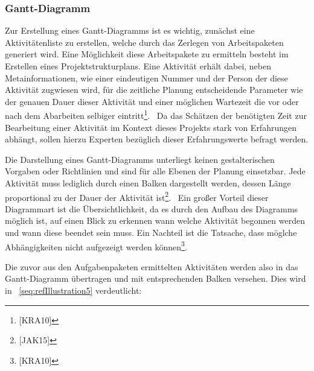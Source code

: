 \documentclass[a4paper]{article}
\begin{document}
\subsubsection[Gantt{}-Diagramm]{\color{black} Gantt-Diagramm}
{\sffamily
Zur Erstellung eines Gantt-Diagramms ist es wichtig, zunächst eine Aktivitätenliste zu erstellen, welche durch das
Zerlegen von Arbeitspaketen generiert wird. Eine Möglichkeit diese Arbeitspakete zu ermitteln besteht im Erstellen
eines Projektstrukturplans. Eine Aktivität erhält dabei, neben Metainformationen, wie einer eindeutigen Nummer und der
Person der diese Aktivität zugwiesen wird, für die zeitliche Planung entscheidende Parameter wie der genauen Dauer
dieser Aktivität und einer möglichen Wartezeit die vor oder nach dem Abarbeiten selbiger eintritt\footnote{[KRA10]}.
\ Da das Schätzen der benötigten Zeit zur Bearbeitung einer Aktivität im Kontext dieses Projekts stark von Erfahrungen
abhängt, sollen hierzu Experten bezüglich dieser Erfahrungswerte befragt werden.}


\bigskip

{\sffamily
Die Darstellung eines Gantt-Diagramms unterliegt keinen gestalterischen Vorgaben oder Richtlinien und sind für alle
Ebenen der Planung einsetzbar. Jede Aktivität muss lediglich durch einen Balken dargestellt werden, dessen Länge
proportional zu der Dauer der Aktivität ist\footnote{[JAK15]}. \ Ein großer Vorteil dieser Diagrammart ist die
Übersichtlichkeit, da es durch den Aufbau des Diagramms möglich ist, auf einen Blick zu erkennen wann welche Aktivität
begonnen werden und wann diese beendet sein muss. Ein Nachteil ist die Tatsache, dass möglche Abhängigkeiten nicht
aufgezeigt werden können\footnote{[KRA10]}. }


\bigskip

{\sffamily
Die zuvor aus den Aufgabenpaketen ermittelten Aktivitäten werden also in das Gantt-Diagramm übertragen und mit
entsprechenden Balken versehen. Dies wird in \figurename~\ref{seq:refIllustration5} verdeutlicht:}
\end{document}
